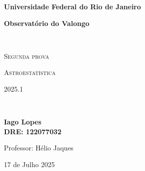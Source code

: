 
\begin{titlepage}
\centering
{\bfseries\LARGE Universidade Federal do Rio de Janeiro \par}
\vspace{0.1cm}
{\bfseries\LARGE Observatório do Valongo \par}
\vfill
\noindent\hrulefill \\
{\scshape\Huge Segunda prova\par} %
\vspace{0.5cm}
{\scshape\Large Astroestatística \par}
\vspace{0.5cm}
{\scshape\Large 2025.1 \par} %
\noindent\hrulefill \\
\vfill
{\bfseries\Large Iago Lopes\\ \small DRE: 122077032 \par}
\vfill
{\Large Professor: Hélio Jaques \par}
\vfill
{\large 17 de Julho 2025 \par} %
\end{titlepage}
\setcounter{page}{1}
\newpage